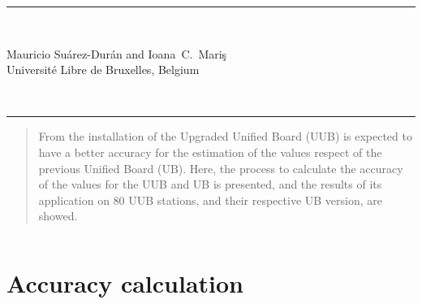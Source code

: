 \documentclass[twoside, final, 10pt]{articleMine}
\begin{document}
\setpagewiselinenumbers
\modulolinenumbers[2]

\linenumbers

\renewcommand\linenumberfont{\small\rmfamily}
\begin{flushright}
\end{flushright}

\begin{flushright}
  \rule{\linewidth}{0.5mm}
  \\[17mm]
  \large
  \parbox[b]{15cm}
  {
    \begin{flushright}
      Mauricio Su\'arez-Dur\'an and  Ioana~C.~Mari\c{s}
      \\[6mm]
      {\small Universit{\'e} Libre de Bruxelles, Belgium}
    \end{flushright}
  }
  \\[5mm]
  \rule{\linewidth}{0.5mm}
\end{flushright}
%
%
\thispagestyle{empty}
\noindent

\begin{abstract}
  \noindent
  From the installation of the Upgraded Unified Board (UUB) is
  expected to have a better accuracy for the estimation of the
  \qpkvem values respect of the previous Unified Board (UB).
  Here, the process to calculate the accuracy of the \qpkvem
  values for the UUB and UB is presented, and the results of its
  application on $80$ UUB stations, and their respective UB
  version, are showed.
\end{abstract}

%
%
\thispagestyle{empty}
$\;$
\noindent
\clearpage

\section*{Accuracy calculation}
\end{document}
